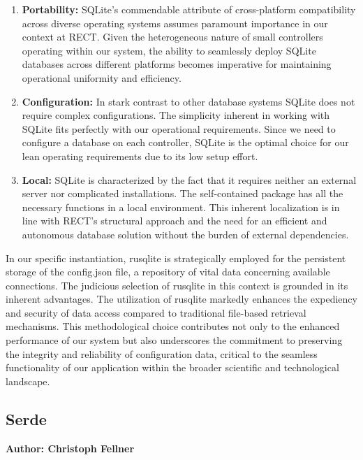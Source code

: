 \begin{enumerate}
    \item \textbf{Portability:} SQLite's commendable attribute of cross-platform compatibility across diverse operating systems assumes paramount importance in 
    our context at RECT. Given the heterogeneous nature of small controllers operating within our system, the ability to seamlessly deploy SQLite databases 
    across different platforms becomes imperative for maintaining operational uniformity and efficiency.
    
    \item \textbf{Configuration:} In stark contrast to other database systems SQLite does not require complex configurations. 
    The simplicity inherent in working with SQLite fits perfectly with our operational requirements. Since we need to configure a database on each controller, 
    SQLite is the optimal choice for our lean operating requirements due to its low setup effort.
    
    \item \textbf{Local:} SQLite is characterized by the fact that it requires neither an external server nor complicated installations. The self-contained package 
    has all the necessary functions in a local environment. This inherent localization is in line with RECT's structural approach and the need for an efficient and 
    autonomous database solution without the burden of external dependencies.
\end{enumerate}

In our specific instantiation, rusqlite is strategically employed for the persistent storage of the config.json file, a repository of vital data concerning 
available connections. The judicious selection of rusqlite in this context is grounded in its inherent advantages. The utilization of rusqlite markedly enhances 
the expediency and security of data access compared to traditional file-based retrieval mechanisms. This methodological choice contributes not only to the 
enhanced performance of our system but also underscores the commitment to preserving the integrity and reliability of configuration data, critical to the seamless
functionality of our application within the broader scientific and technological landscape.

\subsection{Serde}
\textbf{Author: Christoph Fellner}


